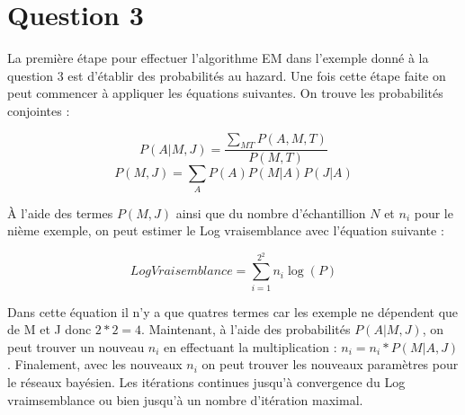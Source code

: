 \documentclass[a4paper, 12pt]{article} %
\begin{document}
\section*{Question 3}
La première étape pour effectuer l'algorithme EM dans l'exemple donné à la question 3 
est d'établir des probabilités au hazard. Une fois cette étape faite on peut commencer 
à appliquer les équations suivantes. On trouve les probabilités conjointes :

\begin{equation}
P(A|M,J) = \frac{\sum\limits_{MT} P(A,M,T)}{P(M,T)}
\end{equation}
\begin{equation}
P(M,J) = \sum\limits_{A} P(A)P(M|A)P(J|A)
\end{equation}

À l'aide des termes $P(M,J)$ ainsi que du nombre d'échantillion $N$ et $n_{i}$ pour le nième
exemple, on peut estimer le Log vraisemblance avec l'équation suivante :

\begin{equation}
Log Vraisemblance = \sum\limits_{i = 1}^{2^{2}} n_{i}\log(P)
\end{equation}

Dans cette équation il n'y a que quatres termes car les exemple ne dépendent que de M et J 
donc $2 * 2 = 4$.
Maintenant, à l'aide des probabilités $P(A|M,J)$, on peut trouver un nouveau $n_{i}$
en effectuant la multiplication : $n_{i} = n_{i} * P(M|A,J)$. Finalement, avec les nouveaux
$n_{i}$ on peut trouver les nouveaux paramètres pour le réseaux bayésien. Les itérations
continues jusqu'à convergence du Log vraimsemblance ou bien jusqu'à un nombre d'itération
maximal.

\end{document}
